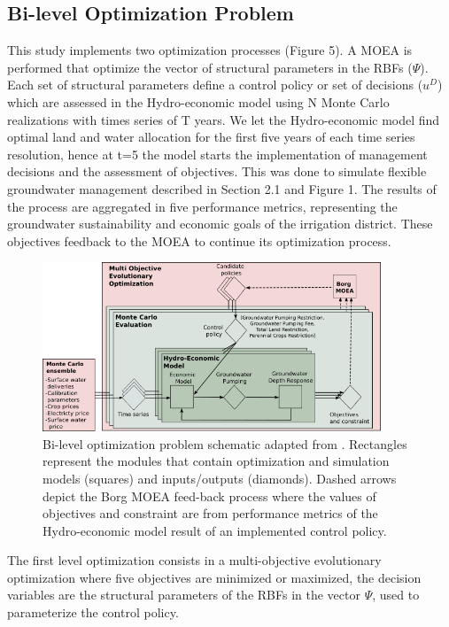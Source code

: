 \documentclass[11pt,a4paper]{article}
\begin{document}
\subsection{Bi-level Optimization Problem}

This study implements two optimization processes (Figure 5). A MOEA is performed that optimize the vector of structural parameters in the RBFs ($\Psi$). Each set of structural parameters define a control policy or set of decisions ($u^{D}$) which are assessed in the Hydro-economic model using N Monte Carlo realizations with times series of T years. We let the Hydro-economic model find optimal land and water allocation for the first five years of each time series resolution, hence at t=5 the model starts the implementation of management decisions and the assessment of objectives. This was done to simulate flexible groundwater management described in Section 2.1 and Figure 1. The results of the process are aggregated in five performance metrics, representing the groundwater sustainability and economic goals of the irrigation district. These objectives feedback to the MOEA to continue its optimization process. 

\begin{figure}[H]
    \centering
    \includegraphics[width=0.9\textwidth]{Diagram2}
    \caption{Bi-level optimization problem schematic adapted from \textcite{hamilton_stream_2022}. Rectangles represent the modules that contain optimization and simulation models (squares) and inputs/outputs (diamonds). Dashed arrows depict the Borg MOEA feed-back process where the values of objectives and constraint are from performance metrics of the Hydro-economic model result of an implemented control policy.}
    \label{fig:m1esh1}
\end{figure}

The first level optimization consists in a multi-objective evolutionary optimization where five objectives are minimized or maximized, the decision variables are the structural parameters of the RBFs in the vector $\Psi$, used to parameterize the control policy. 
\end{document}
